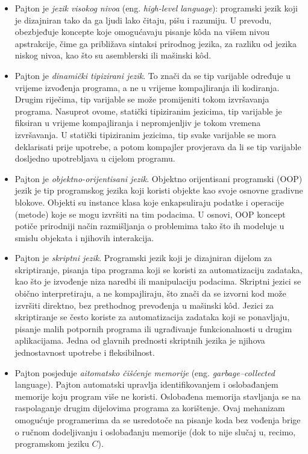 \begin{itemize}
	\item Pajton je \textit{jezik visokog nivoa} (eng. \textit{high-level language}):  programski jezik koji je dizajniran tako da ga ljudi lako čitaju, pišu i razumiju. U prevodu,  obezbjeđuje koncepte koje omogućavaju pisanje k\^oda na višem nivou apstrakcije, čime ga približava sintaksi prirodnog jezika, za razliku od jezika niskog nivoa, kao što su asemblerski ili mašinski k\^od.
	\item Pajton je \textit{dinamički tipizirani jezik}. To znači da  se tip varijable određuje u vrijeme izvođenja programa, a ne u vrijeme kompajliranja ili kodiranja. Drugim riječima, tip varijable se može promijeniti tokom izvršavanja programa. Nasuprot ovome, statički tipiziranim jezicima,  tip varijable je fiksiran u vrijeme kompajliranja i nepromjenljiv je tokom vremena izvršavanja. U statički tipiziranim jezicima,  tip svake varijable se mora deklarisati prije upotrebe, a potom kompajler provjerava da li se tip varijable dosljedno upotrebljava u cijelom programu.
	\item Pajton je \textit{objektno-orijentisani jezik}.  Objektno orijentisani programski (OOP) jezik  je tip programskog jezika koji koristi objekte kao svoje osnovne gradivne blokove. Objekti su instance klasa koje enkapsuliraju podatke i operacije (metode) koje se mogu izvršiti na tim podacima. U osnovi,  OOP koncept potiče prirodniji način razmišljanja o problemima tako što ih modeluje u smislu objekata i njihovih interakcija.
	\item Pajton je \textit{skriptni jezik}. Programski jezik koji je dizajniran dijelom za  skriptiranje,   pisanja tipa programa koji se koristi za automatizaciju zadataka, kao što je izvođenje niza naredbi ili manipulaciju podacima. Skriptni jezici se obično interpretiraju, a ne kompajliraju, što znači da se izvorni kod može izvršiti direktno, bez prethodnog prevođenja u mašinski k\^od.  	Jezici za skriptiranje se često koriste za   automatizacija zadataka koji se ponavljaju, pisanje malih potpornih programa ili ugrađivanje funkcionalnosti u drugim aplikacijama. Jedna od glavnih prednosti skriptnih jezika je njihova jednostavnost upotrebe i fleksibilnost.
	\item Pajton posjeduje \textit{aitomatsko čišćenje memorije} (eng. \textit{garbage--collected} language).  Pajton automatski upravlja   identifikovanjem i oslobađanjem memorije koju program više ne koristi.  Oslobađena memorija  stavljanja se na raspolaganje drugim dijelovima programa za korištenje.   Ovaj mehanizam omogućuje  programerima  da se usredotoče na pisanje koda bez vođenja brige o ručnom dodeljivanju i oslobađanju memorije (dok to nije slučaj u, recimo, programskom jeziku $C$).
\end{itemize}

